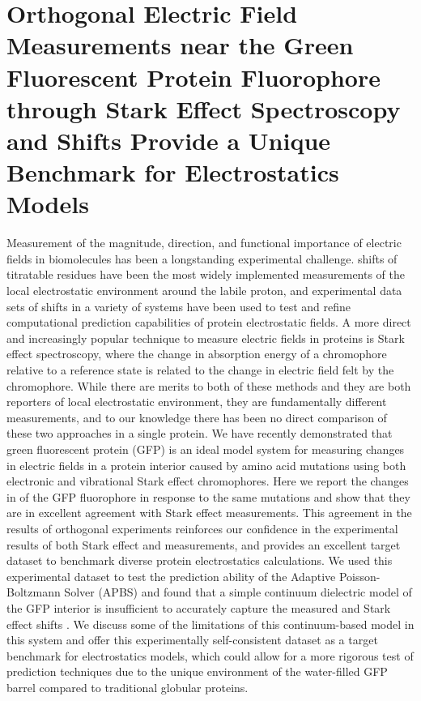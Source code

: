 \chapter{Orthogonal Electric Field Measurements near the Green Fluorescent Protein Fluorophore through Stark Effect Spectroscopy and \pKa{} Shifts Provide a Unique Benchmark for Electrostatics Models} \label{gfp-pKa}

Measurement of the magnitude, direction, and functional importance of electric fields in biomolecules has been a longstanding experimental challenge. 
\pKa{} shifts of titratable residues have been the most widely implemented measurements of the local electrostatic environment around the labile proton, and experimental data sets of \pKa{} shifts in a variety of systems have been used to test and refine computational prediction capabilities of protein electrostatic fields. 
A more direct and increasingly popular technique to measure electric fields in proteins is Stark effect spectroscopy, where the change in absorption energy of a chromophore relative to a reference state is related to the change in electric field felt by the chromophore. While there are merits to both of these methods and they are both reporters of local electrostatic environment, they are fundamentally different measurements, and to our knowledge there has been no direct comparison of these two approaches in a single protein. 
We have recently demonstrated that green fluorescent protein (GFP) is an ideal model system for measuring changes in electric fields in a protein interior caused by amino acid mutations using both electronic and vibrational Stark effect chromophores. 
Here we report the changes in \pKa{} of the GFP fluorophore in response to the same mutations and show that they are in excellent agreement with Stark effect measurements. 
This agreement in the results of orthogonal experiments reinforces our confidence in the experimental results of both Stark effect and \pKa{} measurements, and provides an excellent target dataset to benchmark diverse protein electrostatics calculations. 
We used this experimental dataset to test the \pKa{} prediction ability of the Adaptive Poisson-Boltzmann Solver (APBS) and found that a simple continuum dielectric model of the GFP interior is insufficient to accurately capture the measured \pKa{} and Stark effect shifts . 
We discuss some of the limitations of this continuum-based model in this system and offer this experimentally self-consistent dataset as a target benchmark for electrostatics models, which could allow for a more rigorous test of \pKa{} prediction techniques due to the unique environment of the water-filled GFP barrel compared to traditional globular proteins.

